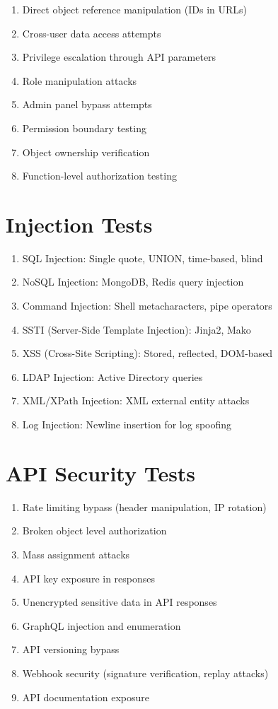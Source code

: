 \documentclass{report}
\begin{document}
\begin{enumerate}
\item Direct object reference manipulation (IDs in URLs)
\item Cross-user data access attempts
\item Privilege escalation through API parameters
\item Role manipulation attacks
\item Admin panel bypass attempts
\item Permission boundary testing
\item Object ownership verification
\item Function-level authorization testing
\end{enumerate}

\section{Injection Tests}

\begin{enumerate}
\item SQL Injection: Single quote, UNION, time-based, blind
\item NoSQL Injection: MongoDB, Redis query injection
\item Command Injection: Shell metacharacters, pipe operators
\item SSTI (Server-Side Template Injection): Jinja2, Mako
\item XSS (Cross-Site Scripting): Stored, reflected, DOM-based
\item LDAP Injection: Active Directory queries
\item XML/XPath Injection: XML external entity attacks
\item Log Injection: Newline insertion for log spoofing
\end{enumerate}

\section{API Security Tests}

\begin{enumerate}
\item Rate limiting bypass (header manipulation, IP rotation)
\item Broken object level authorization
\item Mass assignment attacks
\item API key exposure in responses
\item Unencrypted sensitive data in API responses
\item GraphQL injection and enumeration
\item API versioning bypass
\item Webhook security (signature verification, replay attacks)
\item API documentation exposure
\end{enumerate}
\end{document}

